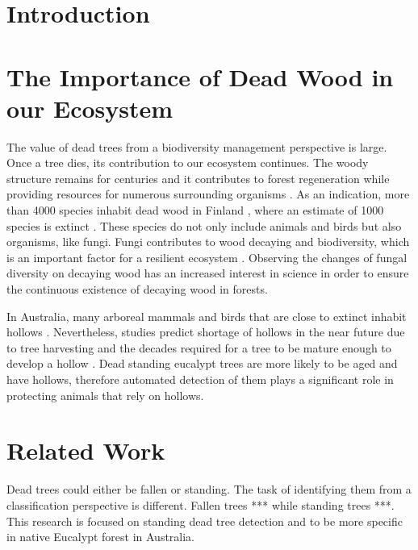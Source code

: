 \documentclass{subfiles}
\begin{document}
\section{Introduction}



\section{The Importance of Dead Wood in our Ecosystem}

\par The value of dead trees from a biodiversity management perspective is large. Once a tree dies, its contribution to our ecosystem continues. The woody structure remains for centuries and it contributes to forest regeneration while providing resources for numerous surrounding organisms \cite{Franklin1987}. As an indication, more than 4000 species inhabit dead wood in Finland \cite{Siitonen2001}, where an estimate of 1000 species is extinct \cite{Hanski2000}. These species do not only include animals and birds but also organisms, like fungi. Fungi contributes to wood decaying and biodiversity, which is an important factor for a resilient ecosystem \cite{Peterson2000}. Observing the changes of fungal diversity on decaying wood has an increased interest in science  \cite{Abrego2011} \cite{Stokland2011} \cite{Lonsdale2008} in order to ensure the continuous existence of decaying wood in forests. 




\par In Australia, many arboreal mammals and birds that are close to extinct inhabit hollows \cite{Gibbons2002}. Nevertheless, studies predict shortage of hollows in the near future due to tree harvesting and the decades required for a tree to be mature enough to develop a hollow \cite{Lindenmayer2010} \cite{Goldingay2009}. Dead standing eucalypt trees are more likely to be aged and have hollows, therefore automated detection of them plays a significant role in protecting animals that rely on hollows. 





\section{Related Work}

Dead trees could either be fallen or standing. The task of identifying them from a classification perspective is different. Fallen trees ***  \cite{Polewski2015} \cite{Mucke2013}
while standing trees ***\cite{Yao2012}. This research is focused on standing dead tree detection and to be more specific in native Eucalypt forest in Australia. 
\end{document}
